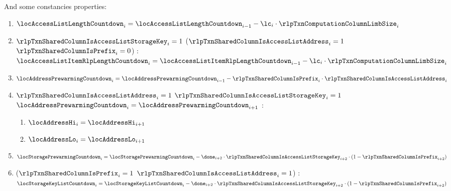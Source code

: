 \begin{enumerate}[resume]
		And some constancies properties:
		\begin{enumerate}
			\item $\locAccessListLengthCountdown _{i} = \locAccessListLengthCountdown _{i - 1} - \lc _{i} \cdot \rlpTxnComputationColumnLimbSize _{i}$
			\item \If $\rlpTxnSharedColumnIsAccessListStorageKey _{i} =1$ \Or ($\rlpTxnSharedColumnIsAccessListAddress _{i} =1$ \et $\rlpTxnSharedColumnIsPrefix _{i} =0$) \Then: $\locAccessListItemRlpLengthCountdown _{i} = \locAccessListItemRlpLengthCountdown _{i - 1} - \lc _{i} \cdot \rlpTxnComputationColumnLimbSize _{i}$
			\item $\locAddressPrewarmingCountdown _{i} = \locAddressPrewarmingCountdown _{i - 1} - \rlpTxnSharedColumnIsPrefix _{i} \cdot \rlpTxnSharedColumnIsAccessListAddress _{i}$
			\item \If $\rlpTxnSharedColumnIsAccessListAddress _{i} =1$ \et $\rlpTxnSharedColumnIsAccessListStorageKey _{i}=1$ \et $\locAddressPrewarmingCountdown _{i} = \locAddressPrewarmingCountdown _{i + 1}$ \Then:
				\begin{enumerate}
					\item $\locAddressHi _{i} = \locAddressHi _{i + 1}$
					\item $\locAddressLo _{i} = \locAddressLo _{i + 1}$
				\end{enumerate}
			\item $\locStoragePrewarmingCountdown _{i} = \locStoragePrewarmingCountdown _{i} - \done _{i + 2} \cdot \rlpTxnSharedColumnIsAccessListStorageKey _{i + 2} \cdot (1 - \rlpTxnSharedColumnIsPrefix _{i + 2})$
			\item \If ($\rlpTxnSharedColumnIsPrefix _{i} =1$ \et $\rlpTxnSharedColumnIsAccessListAddress _{i} =1$) \Then: $\locStorageKeyListCountdown _{i} = \locStorageKeyListCountdown _{i} - \done _{i + 2} \cdot \rlpTxnSharedColumnIsAccessListStorageKey _{i + 2} \cdot (1 - \rlpTxnSharedColumnIsPrefix _{i + 2})$
		\end{enumerate}
	\end{enumerate}
